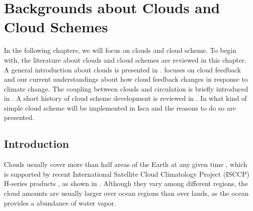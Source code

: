 \chapter{Backgrounds about Clouds and Cloud Schemes}
\label{ch:literature_review_about_clouds}

In the following chapters, we will focus on clouds and cloud scheme. To begin with, the literature about clouds and cloud schemes are reviewed in this chapter. A general introduction about clouds is presented in .  focuses on cloud feedback and our current understandings about how cloud feedback changes in response to climate change. The coupling between clouds and circulation is briefly introduced in . A short history of cloud scheme development is reviewed in . In  what kind of simple cloud scheme will be implemented in Isca and the reasons to do so are presented.




\section{Introduction}
\label{sec:cld_intro}
Clouds usually cover more than half areas of the Earth at any given time \citep{Houze2014,Ramanathan1989}, which is supported by recent International Satellite Cloud Climatology Project (ISCCP) H-series products \citep{Young2018}, as shown in . Although they vary among different regions, the cloud amounts are usually larger over ocean regions than over lands, as the ocean provides a abundance of water vapor.

